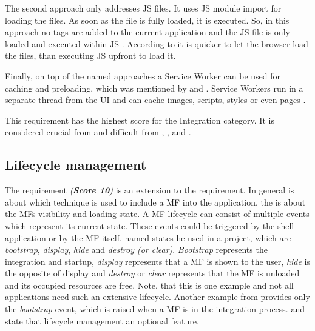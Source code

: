 The second approach only addresses \ac{JS} files.
It uses \ac{JS} module import for loading the files.
As soon as the file is fully loaded, it is executed.
So, in this approach no tags are added to the current application and the \ac{JS} file is only loaded and executed within \ac{JS} \cite{Vogel.2020.Olleck}.
According to \citeauthorMezzalira{} it is quicker to let the browser load the files, than executing \ac{JS} upfront to load it.

Finally, on top of the named approaches a Service Worker can be used for caching and preloading, which was mentioned by \textciteRehm{} and \textciteSteyer{}.
Service Workers run in a separate thread from the \ac{UI} and can cache images, scripts, styles or even pages \cite[p.~24f.]{Sheppard.2017}.

This requirement has the highest score for the Integration category.
It is considered crucial from \textciteHuber{} and difficult from \textciteMezzalira{}, \textciteSteyer{}, \textciteOlleck{} and \textciteJovanovic{}.





\subsection{Lifecycle management}\label{cha:requirement_detail_integration_lifecycle}

The requirement \textit{ (\textbf{Score 10})} is an extension to the \textit{} requirement.
In general \textit{} is about which technique is used to include a \ac{MF} into the application, the \textit{} is about the \acp{MF} visibility and loading state.
A \ac{MF} lifecycle can consist of multiple events which represent its current state.
These events could be triggered by the shell application or by the \ac{MF} itself.
\textciteOlleck{} named states he used in a project, which are \textit{bootstrap}, \textit{display}, \textit{hide} and \textit{destroy (or clear)}.
\textit{Bootstrap} represents the integration and startup, \textit{display} represents that a \ac{MF} is shown to the user, \textit{hide} is the opposite of display and \textit{destroy} or \textit{clear} represents that the \ac{MF} is unloaded and its occupied resources are free.
Note, that this is one example and not all applications need such an extensive lifecycle.
Another example from \textciteRehm{} provides only the \textit{bootstrap} event, which is raised when a \ac{MF} is in the integration process.
\citeauthorRehm{} and \textciteSteyer{} state that lifecycle management an optional feature.

